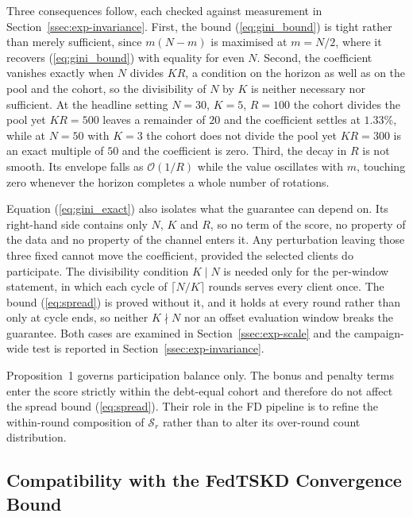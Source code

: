 \documentclass[journal]{IEEEtran}
\newcommand{\rev}[1]{#1}
\begin{document}
\rev{Three consequences follow, each checked against measurement in Section~\ref{ssec:exp-invariance}. First, the bound (\ref{eq:gini_bound}) is tight rather than merely sufficient, since $m(N-m)$ is maximised at $m = N/2$, where it recovers (\ref{eq:gini_bound}) with equality for even $N$. Second, the coefficient vanishes exactly when $N$ divides $KR$, a condition on the horizon as well as on the pool and the cohort, so the divisibility of $N$ by $K$ is neither necessary nor sufficient. At the headline setting $N=30$, $K=5$, $R=100$ the cohort divides the pool yet $KR = 500$ leaves a remainder of $20$ and the coefficient settles at $1.33\%$, while at $N=50$ with $K=3$ the cohort does not divide the pool yet $KR = 300$ is an exact multiple of $50$ and the coefficient is zero. Third, the decay in $R$ is not smooth. Its envelope falls as $\mathcal{O}(1/R)$ while the value oscillates with $m$, touching zero whenever the horizon completes a whole number of rotations.}

\rev{Equation (\ref{eq:gini_exact}) also isolates what the guarantee can depend on. Its right-hand side contains only $N$, $K$ and $R$, so no term of the score, no property of the data and no property of the channel enters it. Any perturbation leaving those three fixed cannot move the coefficient, provided the selected clients do participate. The divisibility condition $K \mid N$ is needed only for the per-window statement, in which each cycle of $\lceil N/K \rceil$ rounds serves every client once. The bound (\ref{eq:spread}) is proved without it, and it holds at every round rather than only at cycle ends, so neither $K \nmid N$ nor an offset evaluation window breaks the guarantee. Both cases are examined in Section~\ref{ssec:exp-scale} and the campaign-wide test is reported in Section~\ref{ssec:exp-invariance}.}

Proposition~1 governs participation balance only. The bonus and penalty terms enter the score strictly within the debt-equal cohort and therefore do not affect the spread bound (\ref{eq:spread}). Their role in the FD pipeline is to refine the within-round composition of $\mathcal{S}_r$ rather than to alter its over-round count distribution. %

\subsection{Compatibility with the FedTSKD Convergence Bound}
\label{ssec:convergence-compat}
\end{document}
